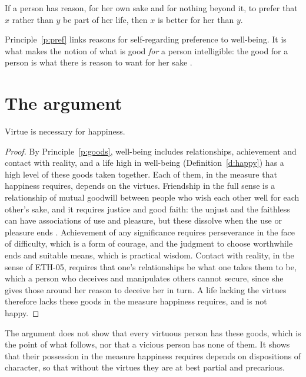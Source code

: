 \documentclass{situationist-preprint}
\begin{document}
\begin{principle}\label{p:pref}
If a person has reason, for her own sake and for nothing beyond it, to prefer that $x$ rather than $y$ be part of her life, then $x$ is better for her than $y$.
\end{principle}

Principle~\ref{p:pref} links reasons for self-regarding preference to well-being. It is what makes the notion of what is good \emph{for} a person intelligible: the good for a person is what there is reason to want for her sake \citep{Darwall2002}.

\section{The argument}

\begin{lemma}[Necessity]\label{l:nec}
Virtue is necessary for happiness.
\end{lemma}

\begin{proof}
By Principle~\ref{p:goods}, well-being includes relationships, achievement and contact with reality, and a life high in well-being (Definition~\ref{d:happy}) has a high level of these goods taken together. Each of them, in the measure that happiness requires, depends on the virtues. Friendship in the full sense is a relationship of mutual goodwill between people who wish each other well for each other's sake, and it requires justice and good faith: the unjust and the faithless can have associations of use and pleasure, but these dissolve when the use or pleasure ends \citep[VIII.3--4]{AristotleNE}. Achievement of any significance requires perseverance in the face of difficulty, which is a form of courage, and the judgment to choose worthwhile ends and suitable means, which is practical wisdom. Contact with reality, in the sense of ETH-05, requires that one's relationships be what one takes them to be, which a person who deceives and manipulates others cannot secure, since she gives those around her reason to deceive her in turn. A life lacking the virtues therefore lacks these goods in the measure happiness requires, and is not happy.
\end{proof}

The argument does not show that every virtuous person has these goods, which is the point of what follows, nor that a vicious person has none of them. It shows that their possession in the measure happiness requires depends on dispositions of character, so that without the virtues they are at best partial and precarious.
\end{document}
